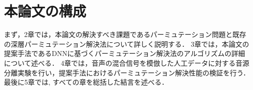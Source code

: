 \section{本論文の構成}
まず，2章では，本論文の解決すべき課題であるパーミュテーション問題と既存の深層パーミュテーション解決法について詳しく説明する．
3章では，本論文の提案手法であるDNNに基づくパーミュテーション解決法のアルゴリズムの詳細について述べる．
4章では，音声の混合信号を模倣した人工データに対する音源分離実験を行い，提案手法におけるパーミュテーション解決性能の検証を行う．
最後に5章では, すべての章を総括した結言を述べる．



